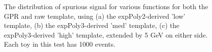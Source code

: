 \begin{figure} 
\begin{center}

\caption{The distribution of spurious signal for various functions for both the GPR and raw template, using (a) the expPoly2-derived 'low' template, (b) the expPoly3-derived 'med' template, (c) the expPoly3-derived 'high' template, extended by 5 GeV on either side. Each toy in this test has 1000 events.}
\label{fig:padded_lowpt_1000_noSig}
\end{center}
\end{figure}

